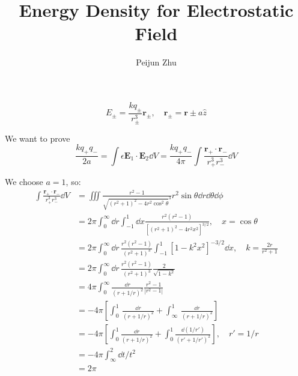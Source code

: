 \documentclass{article}
\title{Energy Density for Electrostatic Field}
\author{Peijun Zhu}
\begin{document}
\maketitle
\[E_\pm=\frac{kq_\pm}{r_\pm^3}\bm r_\pm,\quad \bm r_\pm=\bm r\pm a\hat z\]

We want to prove \[\frac{kq_+q_-}{2a}=\int\epsilon \bm E_1\cdot \bm E_2\dd V=\frac{kq_+q_-}{4\pi}\int  \frac{\bm r_+\cdot \bm r_-}{r_+^3r_-^3} \dd V\]

We choose $a=1$, so:
\begin{align}
\int\frac{\bm r_+\cdot \bm r_-}{r_+^3r_-^3}\dd V&=\iiint\frac{r^2-1}{\sqrt{(r^2+1)^2-4r^2\cos^2\theta}^3}r^2\sin\theta \dd r\dd\theta \dd\phi\\
&=2\pi\int_0^\infty\dd r\int_{-1}^{1}\dd x \frac{r^2(r^2-1)}{[(r^2+1)^2-4r^2x^2]^{3/2}}, \quad x=\cos\theta\\
&=2\pi\int_0^\infty\dd r\,\frac{r^2(r^2-1)}{(r^2+1)^3} \int_{-1}^1[1-k^2x^2]^{-3/2}\dd x, \quad k=\frac{2r}{r^2+1}\\
&=2\pi\int_0^\infty\dd r\,\frac{r^2(r^2-1)}{(r^2+1)^3} \frac{2}{\sqrt{1-k^2}}\\
&=4\pi\int_0^\infty\frac{\dd r}{(r+1/r)^2} \frac{r^2-1}{|r^2-1|}\\
&=-4\pi\left[\int_0^1\,\frac{\dd r}{(r+1/r)^2}+\int_{\infty}^1\,\frac{\dd r}{(r+1/r)^2}\right]\\
&=-4\pi\left[\int_0^1\frac{\dd r}{(r+1/r)^2}+\int_0^1\frac{\dd(1/r')}{(r'+1/r')^2}\right],\quad r'=1/r\\
&=-4\pi \int_\infty^2 \dd t/t^2\\
&=2\pi
\end{align}
\end{document}
